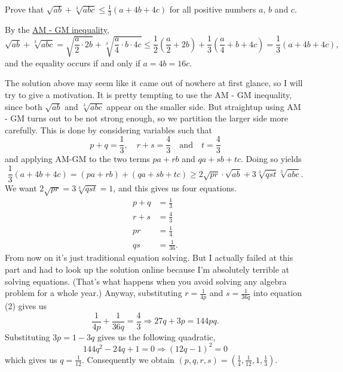 \begin{question}
    Prove that $\sqrt{ab} + \sqrt[3]{abc} \leq \frac{1}{3}(a + 4b + 4c)$ for
    all positive numbers $a$, $b$ and $c$. 
\end{question}
\begin{solution}
    By the \hyperref[thm: amgm]{AM - GM inequality},
    \[ \sqrt{ab} + \sqrt[3]{abc} = \sqrt{\frac{a}{2} \cdot 2b} +
    \sqrt[3]{\frac{a}{4} \cdot b \cdot 4c} \leq \frac{1}{2} \left( \frac{a}{2}
    + 2b \right) + \frac{1}{3} \left( \frac{a}{4} + b + 4c \right) = \frac{1}{3} (a
    + 4b + 4c), \]
    and the equality occurs if and only if $a = 4b = 16c$.
\end{solution}
\begin{remark}
    The solution above may seem like it came out of nowhere at first glance, so
    I will try to give a motivation. It is pretty tempting to use the AM - GM
    inequality, since both $\sqrt{ab}$ and $\sqrt[3]{abc}$ appear on the
    smaller side. But straightup using AM - GM turns out to be not strong
    enough, so we partition the larger side more carefully. This is done by
    considering variables such that 
    \[ p + q = \frac{1}{3},\quad r + s = \frac{4}{3} \quad \text{and} \quad
    t=\frac{4}{3} \]
    and applying AM-GM to the two terms $pa+rb$ and $qa+sb+tc$. Doing so yields
    \[ \frac{1}{3}(a + 4b + 4c) = (pa + rb) + (qa + sb + tc)\geq
    2\sqrt{pr}\cdot \sqrt{ab} + 3\sqrt[3]{qst}\sqrt[3]{abc}. \]
    We want $2\sqrt{pr} = 3\sqrt[3]{qst} = 1$, and this gives us four equations.
    \setcounter{equation}{0}
    \begin{align}
    p+q&=\frac{1}{3}\\
    r+s&=\frac{4}{3}\\
    pr&=\frac{1}{4}\\
    qs&=\frac{1}{36}.
    \end{align}
    From now on it's just traditional equation solving. But I actually failed
    at this part and had to look up the solution online because I'm absolutely
    terrible at solving equations. (That's what happens when you avoid solving
    any algebra problem for a whole year.) Anyway, substituting $r =
    \frac{1}{4p}$ and $s = \frac{1}{36q}$ into equation (2) gives us 
    \[ \frac{1}{4p} + \frac{1}{36q} = \frac{4}{3}\Longrightarrow 27q + 3p =
    144pq. \]
    Substituting $3p = 1 - 3q$ gives us the following quadratic, 
    \[144q^2 - 24q + 1 = 0 \Longrightarrow (12q - 1)^2 = 0\] 
    which gives us $q = \frac{1}{12}$. Consequently we obtain
    $(p,q,r,s) = (\frac{1}{4}, \frac{1}{12}, 1, \frac{1}{3})$.
\end{remark}


